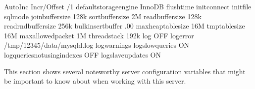 \documentclass[letterpaper,10pt,english]{sphinxmanual}
\begin{document}
\begin{sphinxVerbatim}[commandchars=\\\{\}]
     Auto\PYGZhy{}Inc Incr/Offset  /1
   default\PYGZus{}storage\PYGZus{}engine  InnoDB
               flush\PYGZus{}time  
             init\PYGZus{}connect 
                init\PYGZus{}file 
                 sql\PYGZus{}mode 
         join\PYGZus{}buffer\PYGZus{}size  128k
         sort\PYGZus{}buffer\PYGZus{}size  2M
         read\PYGZus{}buffer\PYGZus{}size  128k
     read\PYGZus{}rnd\PYGZus{}buffer\PYGZus{}size  256k
       bulk\PYGZus{}insert\PYGZus{}buffer  .00
      max\PYGZus{}heap\PYGZus{}table\PYGZus{}size  16M
           tmp\PYGZus{}table\PYGZus{}size  16M
       max\PYGZus{}allowed\PYGZus{}packet  1M
             thread\PYGZus{}stack  192k
                      log  OFF
                log\PYGZus{}error  /tmp/12345/data/mysqld.log
             log\PYGZus{}warnings  
         log\PYGZus{}slow\PYGZus{}queries  ON
log\PYGZus{}queries\PYGZus{}not\PYGZus{}using\PYGZus{}indexes  OFF
        log\PYGZus{}slave\PYGZus{}updates  ON
\end{sphinxVerbatim}

\sphinxAtStartPar
This section shows several noteworthy server configuration variables that might
be important to know about when working with this server.
\end{document}
